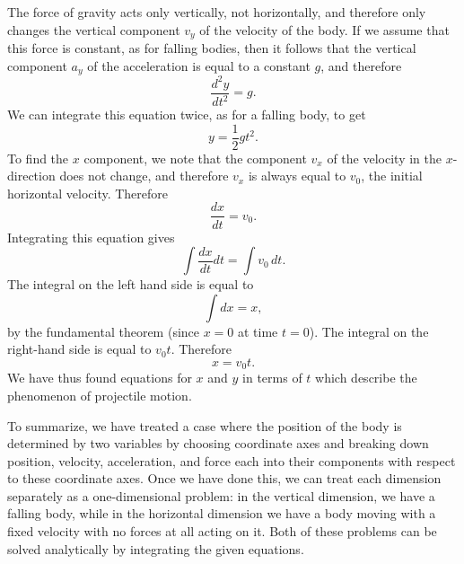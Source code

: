 \documentclass[twoside,openright]{article}
\begin{document}
The force of gravity acts only vertically, not horizontally, and
therefore only changes the vertical component $v_y$ of the velocity of
the body.  If we assume that this force is constant, as for falling
bodies, then it follows that the vertical component $a_y$ of the
acceleration is equal to a constant $g$, and therefore
$$\frac{d^2y}{dt^2} = g.$$
We can integrate this equation twice, as for a falling body, to get
$$y = \frac{1}{2}gt^2.$$
To find the $x$ component, we note that the component $v_x$ of the
velocity in the $x$-direction does not change, and therefore $v_x$ is
always equal to $v_0$, the initial horizontal velocity.  Therefore
$$\frac{dx}{dt} = v_0.$$
Integrating this equation gives
$$\int\!\frac{dx}{dt}dt = \int\!v_0\,dt.$$
The integral on the left hand side is equal to
$$\int\!dx = x,$$
by the fundamental theorem (since $x=0$ at time $t=0$).  The integral
on the right-hand side is equal to $v_0t.$ Therefore
$$x = v_0t.$$ 
We have thus found equations for $x$ and $y$ in terms of $t$ which
describe the phenomenon of projectile motion.

To summarize, we have treated a case where the position of the body is
determined by two variables by choosing coordinate axes and breaking
down position, velocity, acceleration, and force each into their
components with respect to these coordinate axes.  Once we have done
this, we can treat each dimension separately as a one-dimensional
problem: in the vertical dimension, we have a falling body, while in
the horizontal dimension we have a body moving with a fixed velocity
with no forces at all acting on it.  Both of these problems can be
solved analytically by integrating the given equations. \vspace{2ex}
\end{document}
